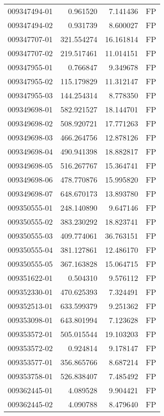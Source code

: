 \begin{tabular}{lrrl}
009347494-01 &    0.961520 &     7.141436 &   FP \\
009347494-02 &    0.931739 &     8.600027 &   FP \\
009347707-01 &  321.554274 &    16.161814 &   FP \\
009347707-02 &  219.517461 &    11.014151 &   FP \\
009347955-01 &    0.766847 &     9.349678 &   FP \\
009347955-02 &  115.179829 &    11.312147 &   FP \\
009347955-03 &  144.254314 &     8.778350 &   FP \\
009349698-01 &  582.921527 &    18.144701 &   FP \\
009349698-02 &  508.920721 &    17.771263 &   FP \\
009349698-03 &  466.264756 &    12.878126 &   FP \\
009349698-04 &  490.941398 &    18.882817 &   FP \\
009349698-05 &  516.267767 &    15.364741 &   FP \\
009349698-06 &  478.770876 &    15.995820 &   FP \\
009349698-07 &  648.670173 &    13.893780 &   FP \\
009350555-01 &  248.140890 &     9.647146 &   FP \\
009350555-02 &  383.230292 &    18.823741 &   FP \\
009350555-03 &  409.774061 &    36.763151 &   FP \\
009350555-04 &  381.127861 &    12.486170 &   FP \\
009350555-05 &  367.163828 &    15.064715 &   FP \\
009351622-01 &    0.504310 &     9.576112 &   FP \\
009352330-01 &  470.625393 &     7.324491 &   FP \\
009352513-01 &  633.599379 &     9.251362 &   FP \\
009353098-01 &  643.801994 &     7.123628 &   FP \\
009353572-01 &  505.015544 &    19.103203 &   FP \\
009353572-02 &    0.924814 &     9.178147 &   FP \\
009353577-01 &  356.865766 &     8.687214 &   FP \\
009353758-01 &  526.838407 &     7.485492 &   FP \\
009362445-01 &    4.089528 &     9.904421 &   FP \\
009362445-02 &    4.090788 &     8.479640 &   FP \\

\end{tabular}
